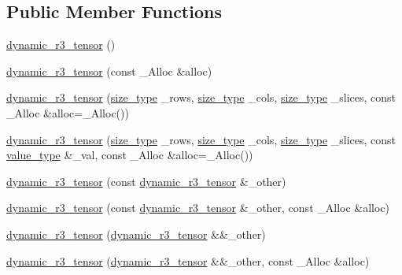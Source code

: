 \subsection*{Public Member Functions}
\begin{DoxyCompactItemize}
\item 
\hyperlink{classcrsc_1_1dynamic__r3__tensor_ac209fc0f1500d5b5ce79f5e5c431fa24}{dynamic\+\_\+r3\+\_\+tensor} ()
\item 
\hyperlink{classcrsc_1_1dynamic__r3__tensor_a593035bc227bdd1f3adcd6c824c660e4}{dynamic\+\_\+r3\+\_\+tensor} (const \+\_\+\+Alloc \&alloc)
\item 
\hyperlink{classcrsc_1_1dynamic__r3__tensor_a5187a75fd4449aeb111ab6a3752253eb}{dynamic\+\_\+r3\+\_\+tensor} (\hyperlink{classcrsc_1_1dynamic__r3__tensor_a00e5f1f46f16d0c0ac1cffa6bd0fe862}{size\+\_\+type} \+\_\+rows, \hyperlink{classcrsc_1_1dynamic__r3__tensor_a00e5f1f46f16d0c0ac1cffa6bd0fe862}{size\+\_\+type} \+\_\+cols, \hyperlink{classcrsc_1_1dynamic__r3__tensor_a00e5f1f46f16d0c0ac1cffa6bd0fe862}{size\+\_\+type} \+\_\+slices, const \+\_\+\+Alloc \&alloc=\+\_\+\+Alloc())
\item 
\hyperlink{classcrsc_1_1dynamic__r3__tensor_af8f6d972fb39d158f28653c14a4cb4f0}{dynamic\+\_\+r3\+\_\+tensor} (\hyperlink{classcrsc_1_1dynamic__r3__tensor_a00e5f1f46f16d0c0ac1cffa6bd0fe862}{size\+\_\+type} \+\_\+rows, \hyperlink{classcrsc_1_1dynamic__r3__tensor_a00e5f1f46f16d0c0ac1cffa6bd0fe862}{size\+\_\+type} \+\_\+cols, \hyperlink{classcrsc_1_1dynamic__r3__tensor_a00e5f1f46f16d0c0ac1cffa6bd0fe862}{size\+\_\+type} \+\_\+slices, const \hyperlink{classcrsc_1_1dynamic__r3__tensor_ad7fb44388c819fb7947771da18bb625b}{value\+\_\+type} \&\+\_\+val, const \+\_\+\+Alloc \&alloc=\+\_\+\+Alloc())
\item 
\hyperlink{classcrsc_1_1dynamic__r3__tensor_a9084a47ea043e856f30d2e526b9300f6}{dynamic\+\_\+r3\+\_\+tensor} (const \hyperlink{classcrsc_1_1dynamic__r3__tensor}{dynamic\+\_\+r3\+\_\+tensor} \&\+\_\+other)
\item 
\hyperlink{classcrsc_1_1dynamic__r3__tensor_ae91561f35bc6a0a0c69eaf224092e154}{dynamic\+\_\+r3\+\_\+tensor} (const \hyperlink{classcrsc_1_1dynamic__r3__tensor}{dynamic\+\_\+r3\+\_\+tensor} \&\+\_\+other, const \+\_\+\+Alloc \&alloc)
\item 
\hyperlink{classcrsc_1_1dynamic__r3__tensor_a33713f05bb82bac135b84bc6bf241bee}{dynamic\+\_\+r3\+\_\+tensor} (\hyperlink{classcrsc_1_1dynamic__r3__tensor}{dynamic\+\_\+r3\+\_\+tensor} \&\&\+\_\+other)
\item 
\hyperlink{classcrsc_1_1dynamic__r3__tensor_a0195ca5e9da056ccab9db546c103854d}{dynamic\+\_\+r3\+\_\+tensor} (\hyperlink{classcrsc_1_1dynamic__r3__tensor}{dynamic\+\_\+r3\+\_\+tensor} \&\&\+\_\+other, const \+\_\+\+Alloc \&alloc)

\end{DoxyCompactItemize}
